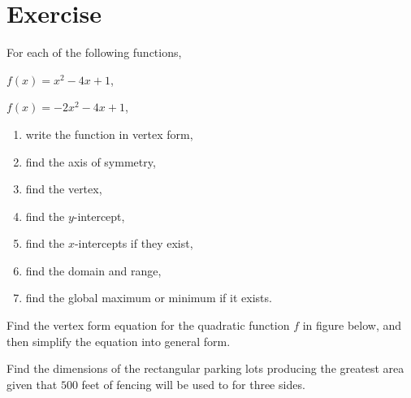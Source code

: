 \newpage

\section*{Exercise}

\begin{exercise}
  For each of the following functions,
  \begin{enumerate*}[label={(\alph*)}]
    \item $f(x)=x^2-4x+1$,
    \item $f(x)=-2x^2-4x+1$,\hfill\null
  \end{enumerate*}
  \begin{enumerate}
    \item write the function in vertex form,
    \item find the axis of symmetry,
    \item find the vertex,
    \item find the $y$-intercept,
    \item find the $x$-intercepts if they exist,
    \item find the domain and range,
    \item find the global maximum or minimum if it exists.
  \end{enumerate}
\end{exercise}

\begin{exercise}
  Find the vertex form equation for the quadratic function $f$ in figure below, and then simplify the equation into general form.
 
 \end{exercise}

\newpage

\begin{exercise}
  Find the dimensions of the rectangular parking lots producing the greatest area given that \(500\) feet of fencing will be used to for three sides.
\end{exercise}

